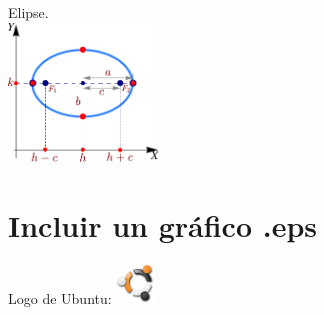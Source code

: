 \documentclass{article} %
\begin{document}
\begin{center}
Elipse.\\ %
\includegraphics[width=4cm]{images/elipse}\\
\end{center}
\section{Incluir un gráfico .eps} 
Logo de Ubuntu: \includegraphics[width=1cm]{images/ubuntu}\ \
\end{document}
